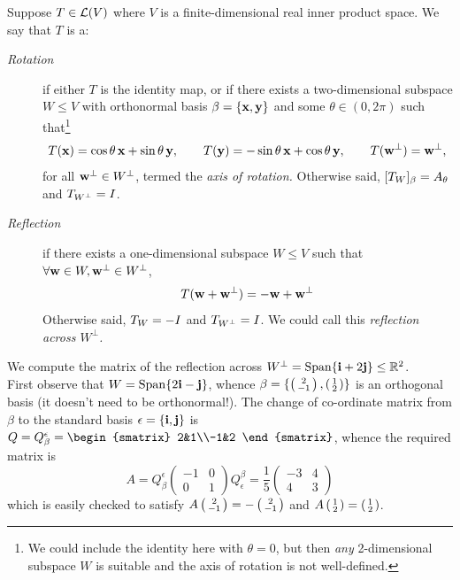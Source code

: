 \begin{defn}{}{}
Suppose $T\in\mathcal{L}(V)$ where $V$ is a finite-dimensional real inner product space. We say that $T$ is a:
\begin{description}
  \item[\normalfont\emph{Rotation}] if either $T$ is the identity map, or if there exists a two-dimensional subspace $W\le V$ with orthonormal basis $\beta=\{{\mathbf{x}},{\mathbf{y}}\}$ and some $\theta\in(0,2\pi)$ such that\footnote{We could include the identity here with $\theta=0$, but then \emph{any} 2-dimensional subspace $W$ is suitable and the axis of rotation is not well-defined.}
  \[T({\mathbf{x}})=\cos\theta\,{\mathbf{x}}+\sin\theta\,{\mathbf{y}},\qquad T({\mathbf{y}})=-\sin\theta\,{\mathbf{x}}+\cos\theta\,{\mathbf{y}},\qquad T({\mathbf{w}}^\perp)={\mathbf{w}}^\perp,\]
  for all ${\mathbf{w}}^\perp\in W^\perp$, termed the \emph{axis of rotation.} Otherwise said, $[T_{W}]_\beta=A_\theta$ and $T_{W^\perp}=I$. 
  
  \item[\normalfont\emph{Reflection}] if there exists a one-dimensional subspace $W\le V$ such that $\forall {\mathbf{w}}\in W,{\mathbf{w}}^\perp\in W^\perp$,
  \[T({\mathbf{w}}+{\mathbf{w}}^\perp)=-{\mathbf{w}}+{\mathbf{w}}^\perp\]
  Otherwise said, $T_{W}=-I$ and $T_{W^\perp}=I$. We could call this \emph{reflection across $W^\perp$.}
\end{description}
\end{defn}

\begin{example}{}{}
We compute the matrix of the reflection across $W^\perp=\operatorname{Span}\{{\mathbf{i}}+2{\mathbf{j}}\}\le\mathbb{R}^2$.\\[5pt]
First observe that $W=\operatorname{Span}\{2{\mathbf{i}}-{\mathbf{j}}\}$, whence $\beta=\{\left(\begin{smallmatrix}2\\-1\end{smallmatrix}\right),\left(\begin{smallmatrix}1\\2\end{smallmatrix}\right)\}$ is an orthogonal basis (it doesn't need to be orthonormal!). The change of co-ordinate matrix from $\beta$ to the standard basis $\epsilon=\{{\mathbf{i}},{\mathbf{j}}\}$ is $Q=Q_\beta^\epsilon=\begin{smatrix}
2&1\\-1&2
\end{smatrix}$, whence the required matrix is
\[A=Q_\beta^\epsilon\begin{pmatrix}
-1&0\\0&1
\end{pmatrix}Q_\epsilon^\beta =\frac 15\begin{pmatrix}
-3&4\\4&3
\end{pmatrix}\]
which is easily checked to satisfy $A\left(\begin{smallmatrix}2\\-1\end{smallmatrix}\right)=-\left(\begin{smallmatrix}2\\-1\end{smallmatrix}\right)$ and $A\left(\begin{smallmatrix}1\\2\end{smallmatrix}\right)=\left(\begin{smallmatrix}1\\2\end{smallmatrix}\right)$.
\end{example}

